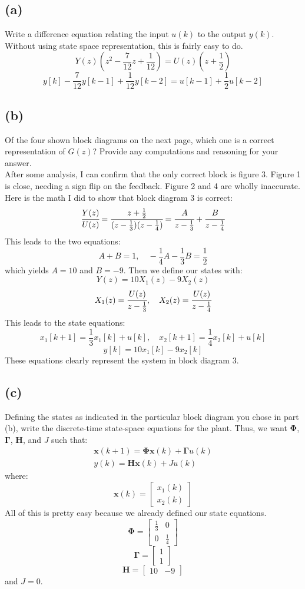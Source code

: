 \documentclass{article}
\begin{document}
\subsection*{(a)}
Write a difference equation relating the input $u(k)$ to the output $y(k)$. Without using state space representation, this is fairly easy to do.
\[Y(z)(z^2-\frac{7}{12}z+\frac{1}{12})=U(z)(z+\frac{1}{2})\]
\[y[k]-\frac{7}{12}y[k-1]+\frac{1}{12}y[k-2]=u[k-1]+\frac{1}{2}u[k-2]\]
\subsection*{(b)}
Of the four shown block diagrams on the next page, which one is a correct representation of $G(z)$? Provide any computations and reasoning for your answer.\\
After some analysis, I can confirm that the only correct block is figure 3. Figure 1 is close, needing a sign flip on the feedback. Figure 2 and 4 are wholly inaccurate. Here is the math I did to show that block diagram 3 is correct:
\[\cfrac{Y(z)}{U(z)}=\cfrac{z+\frac{1}{2}}{(z-\frac{1}{3})(z-\frac{1}{4})}=\cfrac{A}{z-\frac{1}{3}}+\cfrac{B}{z-\frac{1}{4}}\]
This leads to the two equations:
\[A+B=1,\quad -\frac{1}{4}A-\frac{1}{3}B=\frac{1}{2}\]
which yields $A=10$ and $B=-9$. Then we define our states with:
\[Y(z)=10X_1(z)-9X_2(z)\]
\[X_1(z)=\cfrac{U(z)}{z-\frac{1}{3}},\quad X_2(z)=\cfrac{U(z)}{z-\frac{1}{4}}\]
This leads to the state equations:
\[x_1[k+1]=\frac{1}{3}x_1[k]+u[k],\quad x_2[k+1]=\frac{1}{4}x_2[k]+u[k]\]
\[y[k]=10x_1[k]-9x_2[k]\]
These equations clearly represent the system in block diagram 3.
\subsection*{(c)}
Defining the states as indicated in the particular block diagram you chose in part (b), write the discrete-time state-space equations for the plant. Thus, we want $\boldsymbol{\Phi}$, $\boldsymbol{\Gamma}$, $\boldsymbol{H}$, and $J$ such that:
\[\begin{array}{c}\boldsymbol{x}(k+1)=\boldsymbol{\Phi}\boldsymbol{x}(k)+\boldsymbol{\Gamma}u(k)\\y(k)=\boldsymbol{H}\boldsymbol{x}(k)+Ju(k)\end{array}\]
where:
\[\boldsymbol{x}(k)=\begin{bmatrix}x_1(k)\\x_2(k)\end{bmatrix}\]
All of this is pretty easy because we already defined our state equations.
\[\boldsymbol{\Phi}=\begin{bmatrix}\frac{1}{3}&0\\0&\frac{1}{4}\end{bmatrix}\]
\[\boldsymbol{\Gamma}=\begin{bmatrix}1\\1\end{bmatrix}\]
\[\boldsymbol{H}=\begin{bmatrix}10&-9\end{bmatrix}\]
and $J=0$.
\end{document}
